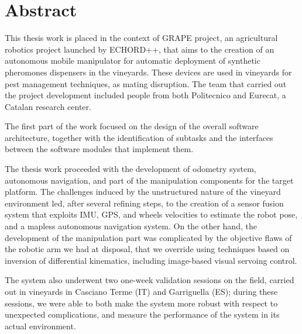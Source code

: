 
\begingroup
\let\clearpage\relax
\let\cleardoublepage\relax
\let\cleardoublepage\relax

\chapter*{Abstract}
This thesis work is placed in the context of \ac{GRAPE} project, an agricultural robotics project launched by \ac{ECHORD++}, that aims to the creation of an autonomous mobile manipulator for automatic deployment of synthetic pheromones dispensers in the vineyards. These devices are used in vineyards for pest management techniques, as mating disruption. The team that carried out the project development included people from both  Politecnico and Eurecat, a Catalan research center.
\par The first part of the work focused on the design of the overall software architecture, together with the identification of subtasks and the interfaces between the software modules that implement them. 
\par The thesis work proceeded with the development of odometry system, autonomous navigation, and part of the manipulation components for the target platform. The challenges induced by the unstructured nature of the vineyard environment led, after several refining steps, to the creation of a sensor fusion system that exploits \ac{IMU}, GPS, and wheels velocities to estimate the robot pose, and a mapless autonomous navigation system. On the other hand, the development of the manipulation part was complicated by the objective flaws of the robotic arm we had at disposal, that we override using techniques based on inversion of differential kinematics, including image-based visual servoing control.
\par The system also underwent two one-week validation sessions on the field, carried out in vineyards in Casciano Terme (IT) and Garriguella (ES); during these sessions, we were able to  both make the system more robust with respect to unexpected complications, and measure the performance of the system in its actual environment.

\vfill
\newpage
{}
